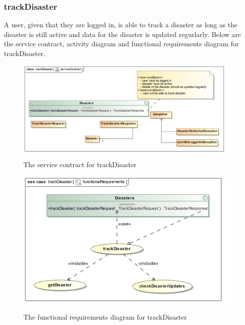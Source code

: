 \subsubsection{trackDisaster}

A user, given that they are logged in, is able to track a disaster as long as the disaster is still active and data for the disaster is updated regurlarly. Below are the service contract, activity diagram and functional requirements diagram for trackDisaster.

\begin{figure}[H]
	\centering
	\includegraphics[scale=0.21]{../images/funcReq/trackDisasterServiceContract.jpg}
	\caption{The service contract for trackDisaster \label{overflow}}
\end{figure}

\begin{figure}[H]
	\centering
	\includegraphics[width=1.2\textwidth]{../images/funcReq/trackDisasterFunctionalRequirements.jpg}
	\caption{The functional requirements diagram for trackDisaster \label{overflow}}
\end{figure}

